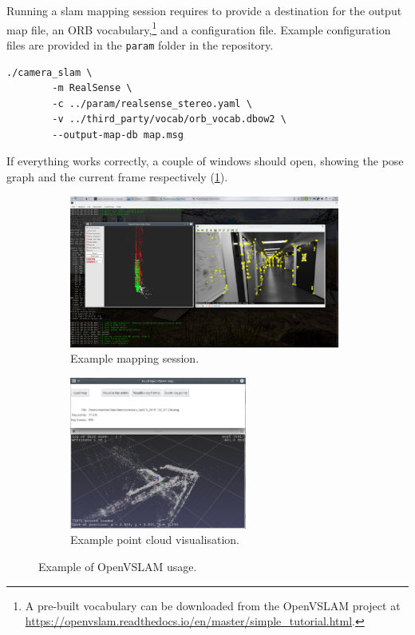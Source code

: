 \documentclass[11pt, letterpaper, twoside]{article}
\begin{document}
Running a \gls{slam} mapping session requires to provide a destination for the
output map file, an ORB vocabulary,\footnote{A pre-built vocabulary can be
downloaded from the OpenVSLAM project at
\url{https://openvslam.readthedocs.io/en/master/simple_tutorial.html}.} and a
configuration file. Example configuration files are provided in the
\texttt{param} folder in the repository.

\begin{Verbatim}[samepage=true]
    ./camera_slam \
        -m RealSense \
        -c ../param/realsense_stereo.yaml \
        -v ../third_party/vocab/orb_vocab.dbow2 \
        --output-map-db map.msg
\end{Verbatim}

If everything works correctly, a couple of windows should open, showing the
pose graph and the current frame respectively (\cref{fig:openvslam_mapping}).

\begin{figure}[tb]
    \centering
    \begin{subfigure}[t]{.59\textwidth}
        \centering
        \includegraphics[height=5cm]{openvslam.png}
        \caption{Example mapping session.}\label{fig:openvslam_mapping}
    \end{subfigure}
    \begin{subfigure}[t]{.39\textwidth}
        \centering
        \includegraphics[height=5cm]{load_map.png}
        \caption{Example point cloud visualisation.}\label{fig:openvslam_load_map}
    \end{subfigure}
    \caption{Example of OpenVSLAM usage.}\label{fig:openvslam}
\end{figure}
\end{document}
